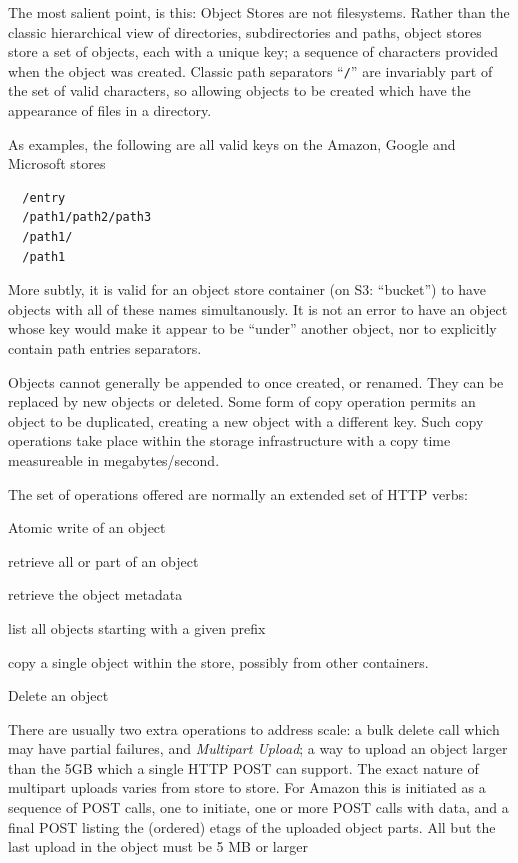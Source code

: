 \documentclass[conference]{IEEEtran}
\begin{document}


The most salient point, is this: Object Stores are not filesystems.
Rather than the classic hierarchical view of directories, subdirectories
and paths, object stores store a set of objects, each with a unique key;
a sequence of characters provided when the object was created.
Classic path separators ``\texttt{/}'' are invariably part of the set of valid
characters, so allowing objects to be created which have the appearance
of files in a directory.

As examples, the following are all valid keys on the Amazon, Google and Microsoft
stores

\begin{verbatim}
  /entry
  /path1/path2/path3
  /path1/
  /path1
\end{verbatim}

More subtly, it is valid for an object store container (on S3: ``bucket'')
to have objects with all of these names simultanously.
It is not an error to have an object whose key would make it appear to be
``under'' another object, nor to explicitly contain path entries separators.

Objects cannot generally be appended to once created, or renamed.
They can be replaced by new objects or deleted.
Some form of copy operation permits an object to be duplicated, creating
a new object with a different key.
Such copy operations take place within the storage infrastructure with a
copy time measureable in megabytes/second.


The set of operations offered are normally an extended set of HTTP verbs:

\begin{description}[leftmargin=8em, style=nextline]
  \item[PUT] Atomic write of an object
  \item[GET] retrieve all or part of an object
  \item[HEAD] retrieve the object metadata
  \item[LIST] list all objects starting with a given prefix
  \item[COPY] copy a single object within the store, possibly from other containers.
  \item[DELETE] Delete an object
\end{description}

There are usually two extra operations to address scale:
 a bulk delete call which may have partial failures,
and \emph{Multipart Upload}; a way to upload an object larger than the 5GB which a single HTTP POST can support.
The exact nature of multipart uploads varies from store to store.
For Amazon this is initiated as a sequence of POST calls, one to initiate,
one or more POST calls with data, and a final POST listing the (ordered)
etags of the uploaded object parts.
All but the last upload in the object must be 5 MB or larger
\end{document}
